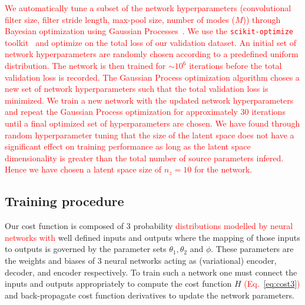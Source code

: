 \documentclass[%
showpacs,
nofootinbib,
 amsmath,amssymb,
 aps,
 twocolumn,
 prl,
 reprint,
floatfix,
]{revtex4-1}
\newcommand{\new}[1]{\textcolor{red}{#1}}
\begin{document}
%
%
\new{We automatically tune a subset of the network hyperparameters
(convolutional filter size, filter stride length, max-pool size, number of
modes ($M$)) through Bayesian optimization using Gaussian
Processes~\cite{Siria2020.06.11.144253}. We use the \texttt{scikit-optimize}
toolkit~\cite{scikit-learn} and optimize on the total loss of our validation
dataset. An initial set of network hyperparameters are randomly chosen
according to a predefined uniform distribution. The network is then trained for
$\sim 10^6$ iterations before the total validation loss is recorded. The
Gaussian Process optimization algorithm choses a new set of network
hyperparameters such that the total validation loss is minimized. We train a
new network with the updated network hyperparameters and repeat the Gaussian
Process optimization for approximately 30 iterations until a final optimized
set of hyperparameters are chosen. We have found through random hyperparameter
tuning that the size of the latent space does not have a significant effect on
training performance as long as the latent space dimensionality is greater than
the total number of source parameters infered.  Hence we have chosen a latent
space size of $n_z=10$ for the network.}

\subsection{Training procedure}\label{app:training_procedure}
%
%
Our cost function is composed of 3 probability \new{distributions modelled by
neural networks with} well defined inputs and outputs where the mapping of
those inputs to outputs is governed by the parameter sets
$\theta_{1},\theta_{2}$ and $\phi$. These parameters are the weights and biases
of 3 neural networks acting as (variational) encoder, decoder, and encoder
respectively. To train such a network one must connect the inputs and outputs
appropriately to compute the cost function $H$ \new{(Eq.~\ref{eq:cost3})} and
back-propagate cost function derivatives to update the network parameters. 
\end{document}
